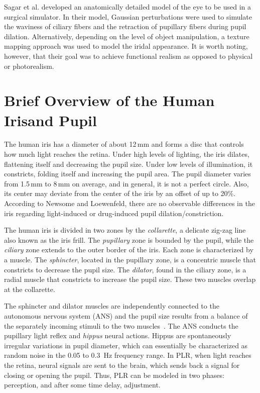 \documentclass{acmtog}
\begin{document}
Sagar et al. developed an anatomically detailed model of the eye to be used in a surgical simulator. In their model,  Gaussian perturbations were used to simulate the waviness of ciliary fibers and the retraction of pupillary fibers during pupil dilation. Alternatively, depending
on the level of object manipulation, a texture mapping approach was used to model the iridal appearance. It is worth
noting, however, that their goal was to achieve functional realism \cite{DS-02} as opposed to physical or photorealism.

\section{Brief Overview of the Human Iris\break and Pupil}
\label{sec:biologicalreview}

The human iris has a diameter of about 12\,mm and forms a disc that controls how much light reaches the retina. Under high levels of lighting, the iris dilates, flattening itself and decreasing the pupil size. Under
low levels of illumination, it constricts, folding itself and increasing the pupil area. The pupil diameter varies from
1.5\,mm to 8\,mm on average, and in general, it is not a perfect circle. Also, its center may deviate
from the center of the iris by an offset of up to 20\%. According to Newsome and
Loewenfeld, there are no observable differences in the iris regarding light-induced or
drug-induced pupil dilation/constriction.

The human iris is divided in two zones by the \emph{collarette}, a delicate zig-zag line also known as the iris frill. The \emph{pupillary} zone is bounded by the pupil, while the \emph{ciliary} zone extends to the outer border of the iris. Each zone is characterized by a muscle. The \emph{sphincter}, located in the pupillary zone, is a concentric muscle that constricts to decrease the pupil size. The \emph{dilator}, found in the ciliary zone, is a radial muscle that constricts to increase the pupil size. These two muscles overlap at the collarette. 

The sphincter and dilator muscles are independently connected to the autonomous nervous system (ANS) and the pupil size results from a balance of the separately incoming stimuli to the two muscles~\cite{Dod-1900}. The ANS conducts the pupillary light reflex and \emph{hippus} neural actions. Hippus are
spontaneously irregular variations in pupil diameter, which can essentially be characterized as random noise in the 0.05 to 0.3~Hz frequency range. In PLR, when light reaches the retina, neural signals are sent to the brain, which sends back a signal for closing or opening the pupil. Thus, PLR can be modeled in two phases:
perception, and after some time delay, adjustment. 
\end{document}

